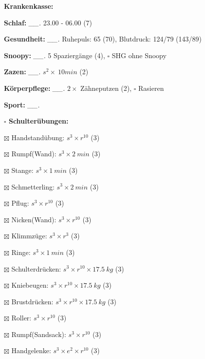 \documentclass[10pt,a4paper]{article}
\newcommand\prop[1] {{\color {alizarin} {\bf #1}}}             %
\newcommand\mand[1] {{\color {burntorange} {\bf #1}}}          %
\newcommand\topspace{\vskip -15pt \hskip 20pt}
\newcommand\n[1] { {\sl #1.} \hskip 5pt }
\begin{document}
\begin{mdframed}[style=daystyle]
  \begin{labeling}{{\mand {Krankenkasse:}}}
    \setlength\itemsep{-3pt}
  \item[{\mand {Schlaf:}}]       \n{\_\_} 23.00 - 06.00 (7)
  \item[{\mand {Gesundheit:}}]   \n{\_\_} Ruhepuls: 65 (70), Blutdruck: 124/79 (143/89)
  \item[{\mand {Snoopy:}}]       \n{\_\_} 5 Spaziergänge (4), $\square$ SHG ohne Snoopy  
  \item[{\mand {Zazen:}}]        \n{\_\_} $s^2 \times\ 10 min$ (2)
  \item[{\mand {Körperpflege:}}] \n{\_\_} $2 \times$ Zähneputzen (2), $\square$ Rasieren
  \item[{\mand {Sport:}}]        \n{\_\_}
    \topspace
    \begin{minipage}{0.75\textwidth}  
      \begin{labeling}{\prop {$\square$ {Schulterübungen:}}} 
        \setlength\itemsep{-3pt}
      \item[$\boxtimes$ Handstandübung:]  $s^3 \times r^{10}$ (3)
      \item[$\boxtimes$ Rumpf(Wand):]     $s^3 \times 2\ min$ (3)
      \item[$\boxtimes$ Stange:]          $s^3 \times 1\ min$ (3)
      \item[$\boxtimes$ Schmetterling:]   $s^3 \times 2\ min$ (3)
      \item[$\boxtimes$ Pflug:]           $s^3 \times r^{10}$ (3)
      \item[$\boxtimes$ Nicken(Wand):]    $s^3 \times r^{10}$ (3)
      \item[$\boxtimes$ Klimmzüge:]       $s^3 \times r^3$ (3)
      \item[$\boxtimes$ Ringe:]           $s^3 \times 1\ min$ (3)
      \item[$\boxtimes$ Schulterdrücken:] $s^3 \times r^{10} \times 17.5\ kg$ (3)
      \item[$\boxtimes$ Kniebeugen:]      $s^3 \times r^{10} \times 17.5\ kg$ (3)
      \item[$\boxtimes$ Brustdrücken:]    $s^3 \times r^{10} \times 17.5\ kg$ (3)
      \item[$\boxtimes$ Roller:]          $s^3 \times r^{10}$ (3)
      \item[$\boxtimes$ Rumpf(Sandsack):] $s^3 \times r^{10}$ (3)
      \item[$\boxtimes$ Handgelenke:]     $s^3 \times e^2 \times r^{10}$ (3)

\end{labeling}
\end{minipage}
\end{labeling}
\end{mdframed}
\end{document}

